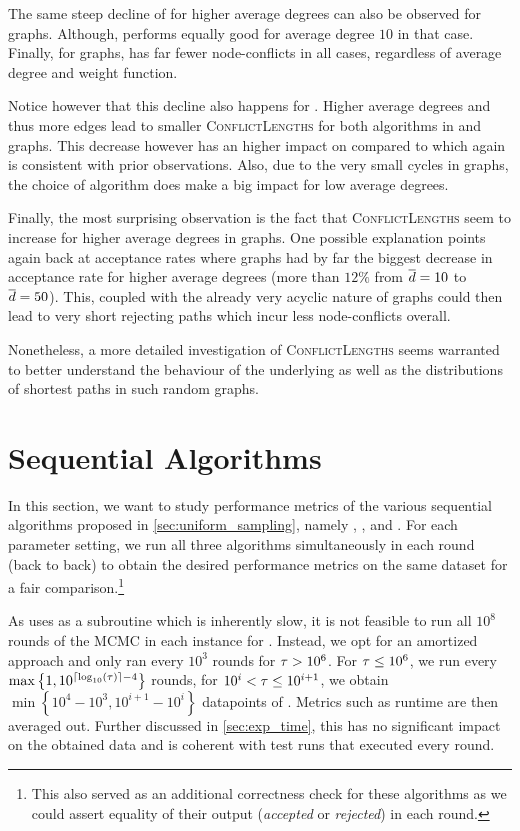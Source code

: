 The same steep decline of \algsp for higher average degrees can also be observed for \rhg graphs.
Although, \algbp performs equally good for average degree $10$ in that case.
Finally, for \dsf graphs, \algbp has far fewer node-conflicts in all cases, regardless of average degree and weight function.

Notice however that this decline also happens for \algbp.
Higher average degrees and thus more edges lead to smaller \textsc{ConflictLengths} for both algorithms in \gnp and \rhg graphs.
This decrease however has an higher impact on \algsp compared to \algbp which again is consistent with prior observations.
Also, due to the very small cycles in \rhg graphs, the choice of algorithm does make a big impact for low average degrees.

Finally, the most surprising observation is the fact that \textsc{ConflictLengths} seem to increase for higher average degrees in \dsf graphs.
One possible explanation points again back at acceptance rates where \dsf graphs had by far the biggest decrease in acceptance rate for higher average degrees (more than $12\%$ from $\overline{d} = 10$ to $\overline{d} = 50$).
This, coupled with the already very acyclic nature of \dsf graphs could then lead to very short rejecting paths which incur less node-conflicts overall.

\bigskip

Nonetheless, a more detailed investigation of \textsc{ConflictLengths} seems warranted to better understand the behaviour of the underlying \markov as well as the distributions of shortest paths in such random graphs. 



\section{Sequential Algorithms}\label{sec:exp_seq}
In this section, we want to study performance metrics of the various sequential algorithms proposed in \cref{sec:uniform_sampling}, namely \algsl, \algsp, and \algbp.
For each parameter setting, we run all three algorithms simultaneously in each round (back to back) to obtain the desired performance metrics on the same dataset for a fair comparison.\footnote{
  This also served as an additional correctness check for these algorithms as we could assert equality of their output (\emph{accepted} or \emph{rejected}) in each round. 
}

As \algsl uses \algbf as a subroutine which is inherently slow, it is not feasible to run all $10^8$ rounds of the MCMC in each instance for \algsl.
Instead, we opt for an amortized approach and only ran \algbf every $10^3$ rounds for $\tau > 10^6$.
For $\tau \leq 10^6$, we run \algbf every $\max\left\{1,10^{\left\lceil \log_{10}(\tau)\right\rceil - 4}\right\}$ rounds, \ie for $10^i < \tau \leq 10^{i + 1}$, we obtain $\min\left\{10^4 - 10^3,10^{i + 1} - 10^i\right\}$ datapoints of \algbf.
Metrics such as runtime are then averaged out.
Further discussed in \cref{sec:exp_time}, this has no significant impact on the obtained data and is coherent with test runs that executed \algbf every round.

